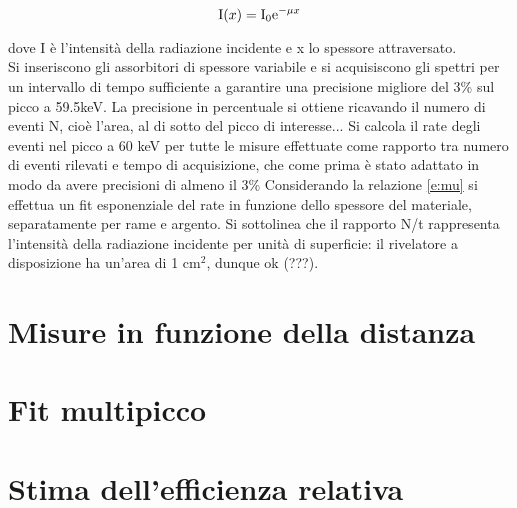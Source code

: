 \documentclass[twocolumn,10pt]{asme2ej}
\begin{document}
\vspace{-15pt}
\begin{equation}
   \text{I}(x) = \text{I}_0 \text{e}^{-\mu x}
    \vspace{-5pt}
    \label{e:mu}
\end{equation}

dove I è l'intensità della radiazione incidente e x lo spessore attraversato. 
\\ Si inseriscono gli assorbitori di spessore variabile e si acquisiscono gli spettri per
un intervallo di tempo sufficiente a garantire una precisione migliore del 3\% sul picco a 59.5keV.
La precisione in percentuale si ottiene ricavando il numero di eventi N, cioè l'area, al di sotto del
picco di interesse...
Si calcola il rate degli eventi nel picco a 60 keV per tutte le misure effettuate come rapporto tra numero di 
eventi rilevati e tempo di acquisizione, che come prima è stato adattato in modo da avere precisioni di almeno il 3\%
Considerando la relazione \autoref{e:mu} si effettua un fit esponenziale del rate in funzione dello spessore del materiale, 
separatamente per rame e argento. Si sottolinea che il rapporto N/t rappresenta l'intensità della radiazione incidente
per unità di superficie: il rivelatore a disposizione ha un'area di 1 $\si{\centi\metre}^2$, dunque ok (???).




\section{Misure in funzione della distanza}\label{s:distanza}









\section{Fit multipicco}\label{s:multipicco}





\section{Stima dell'efficienza relativa}\label{s:efficienza}
\end{document}
